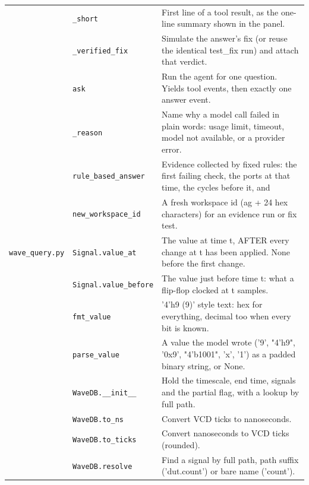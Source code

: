 \begin{longtable}{@{}p{2.8cm}>{\raggedright\arraybackslash}p{4.6cm}p{7.9cm}@{}}
{\small } & \texttt{\small \_\allowbreak{}short} & First line of a tool result, as the one-line summary shown in the panel. \\
{\small } & \texttt{\small \_\allowbreak{}verified\_\allowbreak{}fix} & Simulate the answer's fix (or reuse the identical test\_fix run) and attach that verdict. \\
{\small } & \texttt{\small ask} & Run the agent for one question. Yields tool events, then exactly one answer event. \\
{\small } & \texttt{\small \_\allowbreak{}reason} & Name why a model call failed in plain words: usage limit, timeout, model not available, or a provider error. \\
{\small } & \texttt{\small rule\_\allowbreak{}based\_\allowbreak{}answer} & Evidence collected by fixed rules: the first failing check, the ports at that time, the cycles before it, and \\
{\small } & \texttt{\small new\_\allowbreak{}workspace\_\allowbreak{}id} & A fresh workspace id (ag + 24 hex characters) for an evidence run or fix test. \\
{\small \nolinkurl{wave_query.py}} & \texttt{\small Signal.\allowbreak value\_\allowbreak{}at} & The value at time t, AFTER every change at t has been applied. None before the first change. \\
{\small } & \texttt{\small Signal.\allowbreak value\_\allowbreak{}before} & The value just before time t: what a flip-flop clocked at t samples. \\
{\small } & \texttt{\small fmt\_\allowbreak{}value} & '4'h9 (9)' style text: hex for everything, decimal too when every bit is known. \\
{\small } & \texttt{\small parse\_\allowbreak{}value} & A value the model wrote ('9', "4'h9", '0x9', "4'b1001", 'x', '1') as a padded binary string, or None. \\
{\small } & \texttt{\small WaveDB.\allowbreak \_\allowbreak{}\_\allowbreak{}init\_\allowbreak{}\_\allowbreak{}} & Hold the timescale, end time, signals and the partial flag, with a lookup by full path. \\
{\small } & \texttt{\small WaveDB.\allowbreak to\_\allowbreak{}ns} & Convert VCD ticks to nanoseconds. \\
{\small } & \texttt{\small WaveDB.\allowbreak to\_\allowbreak{}ticks} & Convert nanoseconds to VCD ticks (rounded). \\
{\small } & \texttt{\small WaveDB.\allowbreak resolve} & Find a signal by full path, path suffix ('dut.count') or bare name ('count'). \\

\end{longtable}
